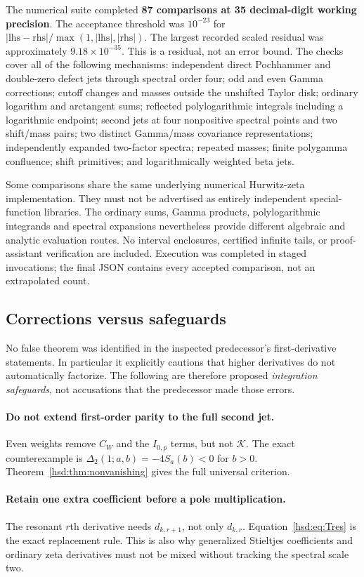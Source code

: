\documentclass[11pt]{article}
\numberwithin{equation}{section}
\theoremstyle{definition}\newtheorem{definition}[theorem]{Definition}
\theoremstyle{remark}\newtheorem{remark}[theorem]{Remark}
\newcommand{\KK}{\mathcal K}
\begin{document}
The numerical suite completed \textbf{87 comparisons at 35 decimal-digit
working precision}. The acceptance threshold was $10^{-23}$ for
$|\mathrm{lhs}-\mathrm{rhs}|/\max(1,|\mathrm{lhs}|,|\mathrm{rhs}|)$.
The largest recorded scaled residual was approximately
$9.18\times10^{-35}$. This is a residual, not an error bound.
The checks cover all of the following mechanisms: independent direct
Pochhammer and double-zero defect jets through spectral order four;
odd and even Gamma corrections; cutoff changes and masses outside the
unshifted Taylor disk; ordinary logarithm and arctangent sums; reflected
polylogarithmic integrals including a logarithmic endpoint; second jets
at four nonpositive spectral points and two shift/mass pairs; two distinct
Gamma/mass covariance representations; independently expanded two-factor
spectra; repeated masses; finite polygamma confluence; shift primitives;
and logarithmically weighted beta jets.

Some comparisons share the same underlying numerical Hurwitz-zeta
implementation. They must not be advertised as entirely independent
special-function libraries. The ordinary sums, Gamma products,
polylogarithmic integrands and spectral expansions nevertheless provide
different algebraic and analytic evaluation routes. No interval
enclosures, certified infinite tails, or proof-assistant verification
are included. Execution was completed in staged invocations; the final
JSON contains every accepted comparison, not an extrapolated count.

\subsection{Corrections versus safeguards}
No false theorem was identified in the inspected predecessor's
first-derivative statements. In particular it explicitly cautions that
higher derivatives do not automatically factorize. The following are
therefore proposed \emph{integration safeguards}, not accusations that
the predecessor made those errors.

\paragraph{Do not extend first-order parity to the full second jet.}
Even weights remove $C_W$ and the $I_{0,p}$ terms, but not $\KK$.
The exact counterexample is $\Delta_2(1;a,b)=-4S_a(b)<0$ for $b>0$.
Theorem~\ref{hsd:thm:nonvanishing} gives the full universal criterion.

\paragraph{Retain one extra coefficient before a pole multiplication.}
The resonant $r$th derivative needs $d_{k,r+1}$, not only $d_{k,r}$.
Equation~\eqref{hsd:eq:Tres} is the exact replacement rule. This is also
why generalized Stieltjes coefficients and ordinary zeta derivatives
must not be mixed without tracking the spectral scale two.
\end{document}

